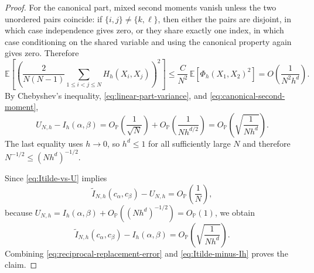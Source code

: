 \documentclass[10pt,a4paper]{amsart}
\begin{document}
\begin{proof}
For the canonical part, mixed second moments vanish unless the two unordered pairs coincide: if $\{i,j\}\neq \{k,\ell\}$, then either the pairs are disjoint, in which case independence gives zero, or they share exactly one index, in which case conditioning on the shared variable and using the canonical property again gives zero. Therefore
\begin{equation}
\label{eq:canonical-second-moment}
\mathbb E\!\left[
\left(
\frac{2}{N(N-1)}
\sum_{1\le i<j\le N} H_h(X_i,X_j)
\right)^2
\right]
\le
\frac{C}{N^2}\,\mathbb E[\Phi_h(X_1,X_2)^2]
=
O\!\left(\frac{1}{N^2h^d}\right).
\end{equation}
By Chebyshev's inequality, \eqref{eq:linear-part-variance}, and \eqref{eq:canonical-second-moment},
\begin{equation}
\label{eq:u-stat-rate}
U_{N,h}-I_h(\alpha,\beta)
=
O_{\mathbb P}\!\left(\frac{1}{\sqrt{N}}\right)
+
O_{\mathbb P}\!\left(\frac{1}{N h^{d/2}}\right)
=
O_{\mathbb P}\!\left(\sqrt{\frac{1}{N h^d}}\right).
\end{equation}
The last equality uses $h\to 0$, so $h^d\le 1$ for all sufficiently large $N$ and therefore $N^{-1/2}\le (Nh^d)^{-1/2}$.

Since \eqref{eq:Itilde-vs-U} implies
\begin{equation}
\widetilde I_{N,h}(c_\alpha,c_\beta)-U_{N,h}
=
O_{\mathbb P}\!\left(\frac{1}{N}\right),
\end{equation}
because $U_{N,h}=I_h(\alpha,\beta)+O_{\mathbb P}((Nh^d)^{-1/2})=O_{\mathbb P}(1)$, we obtain
\begin{equation}
\label{eq:Itilde-minus-Ih}
\widetilde I_{N,h}(c_\alpha,c_\beta)-I_h(\alpha,\beta)
=
O_{\mathbb P}\!\left(\sqrt{\frac{1}{N h^d}}\right).
\end{equation}
Combining \eqref{eq:reciprocal-replacement-error} and \eqref{eq:Itilde-minus-Ih} proves the claim.
\end{proof}
\end{document}
